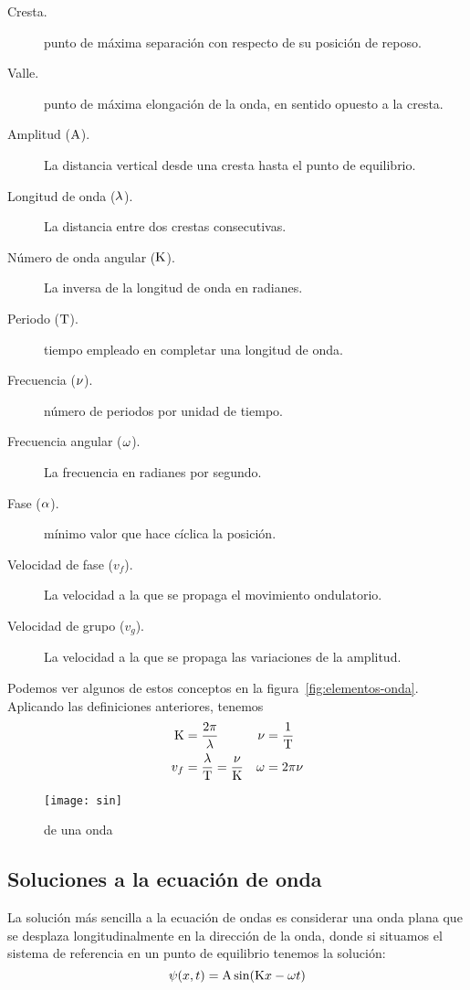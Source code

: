 \begin{description}
    \item[Cresta.] \energial punto de máxima separación con respecto de su posición de reposo.
    \item[Valle.] \energial punto de máxima elongación de la onda, en sentido opuesto a la cresta.
    \item[Amplitud ($\mathrm{A}$).] La distancia vertical desde una cresta hasta el punto de equilibrio.
    \item[Longitud de onda ($\lambda$).] La distancia entre dos crestas consecutivas.
    \item[Número de onda angular ($\mathrm{K}$).] La inversa de la longitud de onda en radianes.
    \item[Periodo ($\mathrm{T}$).] \energial tiempo empleado en completar una longitud de onda.
    \item[Frecuencia ($\nu$).] \energial número de periodos por unidad de tiempo.
    \item[Frecuencia angular ($\omega$).] La frecuencia en radianes por segundo.
    \item[Fase ($\alpha$).] \energial mínimo valor que hace cíclica la posición.
    \item[Velocidad de fase ($v_f$).] La velocidad a la que se propaga el movimiento ondulatorio.
    \item[Velocidad de grupo ($v_g$).] La velocidad a la que se propaga las variaciones de la amplitud.
\end{description}
Podemos ver algunos de estos conceptos en la figura~\eqref{fig:elementos-onda}.
Aplicando las definiciones anteriores, tenemos
\begin{align*}
    \mathrm{K} &= \frac{2\pi}{\lambda} & \nu &=\frac{1}{\mathrm{T}} \\
    v_f &= \frac{\lambda}{\mathrm{T}}=\frac{\nu}{\mathrm{K}} & \omega &= 2\pi\nu
\end{align*}

\begin{figure}[htbp]
    \centering
    \texttt{[image: sin]}
    \caption{\energialementos de una onda}
    \label{fig:elementos-onda}
\end{figure}

\subsection{Soluciones a la ecuación de onda}\label{subsec:soluciones-a-la-ecuación-de-onda}
La solución más sencilla a la ecuación de ondas es considerar una onda plana que se desplaza longitudinalmente en la dirección de la onda, donde si situamos el sistema de referencia en un punto de equilibrio tenemos la solución:
\begin{equation}
    \label{eq:solucion-ecuacion-ondas-simple}
    \psi(x,t)=\mathrm{A}\sin(\mathrm{K} x - \omega t)
\end{equation}

